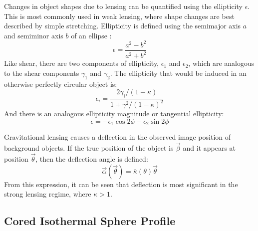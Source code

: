\documentclass[10pt]{article}
\begin{document}
Changes in object shapes due to lensing can be quantified using the ellipticity $\epsilon$. This is most commonly used in weak lensing, where shape changes are best described by simple stretching. Ellipticity is defined using the semimajor axis $a$ and semiminor axis $b$ of an ellipse \citep{Narayan1996}:
\begin{equation}
\epsilon = \frac{a^2 - b^2}{a^2 + b^2}
\end{equation}
Like shear, there are two components of ellipticity, $\epsilon_1$ and $\epsilon_2$, which are analogous to the shear components $\gamma_1$ and $\gamma_2$. The ellipticity that would be induced in an otherwise perfectly circular object is:
\begin{equation} \label{ellipticity}
\epsilon_i = \frac{2 \gamma_i/(1 - \kappa)}{1 + \gamma^2/(1 - \kappa)^2}
\end{equation}
And there is an analogous ellipticity magnitude or tangential ellipticity:
\begin{equation}
\epsilon =  -\epsilon_1 \cos{2\phi} -\epsilon_2 \sin{2\phi}
\end{equation}

Gravitational lensing causes a deflection in the observed image position of background objects. If the true position of the object is $\vec{\beta}$ and it appears at position $\vec{\theta}$, then the deflection angle is defined:
\begin{equation}
\vec{\alpha}(\vec{\theta}) = \overline{\kappa}(\theta)\vec{\theta}
\end{equation}
From this expression, it can be seen that deflection is most significant in the strong lensing regime, where $\kappa > 1$.


\subsection{Cored Isothermal Sphere Profile}
\end{document}
